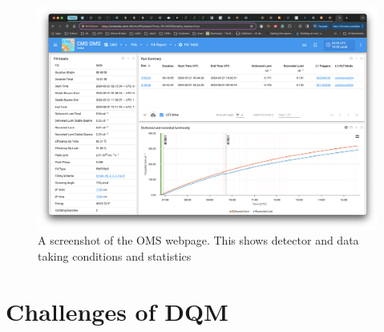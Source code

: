 \begin{figure}
	\includegraphics*[width=1\linewidth,trim = .8in 1.1in .9in 2.19in]{Images/OMS.png}
	\caption{A screenshot of the OMS webpage. This shows detector and data taking conditions and statistics}
	\label{fig:OMS}
\end{figure}


\section{Challenges of DQM}

